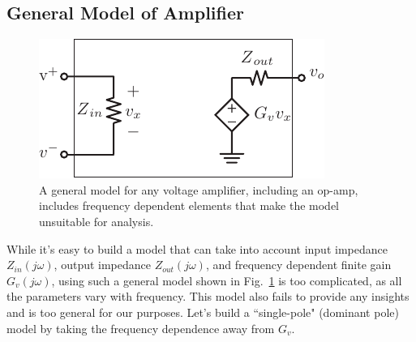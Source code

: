 \subsection{General Model of Amplifier}
\begin{figure}[tb]
\centering
\includegraphics[scale=1]{vampmodelz}
\caption{A general model for any voltage amplifier, including an op-amp, includes frequency dependent elements that make the model unsuitable for analysis.}
\label{fig:vampmodelz}
\end{figure}
While it's easy to build a model that can take into account input impedance $Z_{in}(j\omega)$, output impedance $Z_{out}(j\omega)$, and frequency dependent finite gain $G_v(j\omega)$, using such a general model shown in Fig.~\ref{fig:vampmodelz} is too complicated, as all the parameters vary with frequency.  This model also fails to provide any insights and is too general for our purposes.  Let's build a ``single-pole" (dominant pole) model by taking the frequency dependence away from $G_v$.
